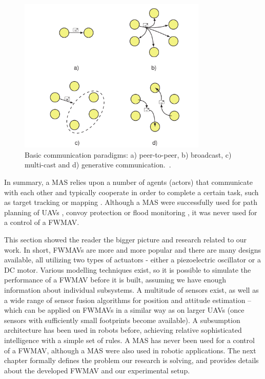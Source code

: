 \begin{figure}
\centering
\includegraphics[width=0.8\textwidth]{Files/Figures/agent_com.png}
\caption[Basic communication paradigms]{Basic communication paradigms: a) peer-to-peer, b) broadcast, c) multi-cast and d) generative communication.~\cite{Siekmann1814}.}
\label{fig:agent_com}
\end{figure}

In summary, a MAS relies upon a number of agents (actors) that communicate with each other and typically cooperate in order to complete a certain task, such as target tracking \cite{Han2013} or mapping \cite{Kovacinal2002}. Although a MAS were successfully used for path planning of UAVs \cite{Shima2005} \cite{Chen2013}, convoy protection \cite{Ding2010} or flood monitoring \cite{Abdelkader2014}, it was never used for a control of a FWMAV.


This section showed the reader the bigger picture and research related to our work. In short, FWMAVs are more and more popular and there are many designs available, all utilizing two types of actuators - either a piezoelectric oscillator or a DC motor. Various modelling techniques exist, so it is possible to simulate the performance of a FWMAV before it is built, assuming we have enough information about individual subsystems. A multitude of sensors exist, as well as a wide range of sensor fusion algorithms for position and attitude estimation -- which can be applied on FWMAVs in a similar way as on larger UAVs (once sensors with sufficiently small footprints become available). A subsumption architecture has been used in robots before, achieving relative sophisticated intelligence with a simple set of rules. A MAS has never been used for a control of a FWMAV, although a MAS were also used in robotic applications. The next chapter formally defines the problem our research is solving, and provides details about the developed FWMAV and our experimental setup.
